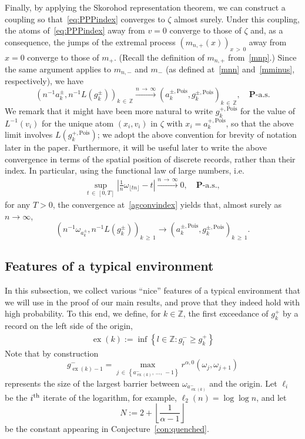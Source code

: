 \documentclass[10pt]{amsart}
\theoremstyle{definition}\newtheorem{defi}[theo]{Definition}\newtheorem{rema}[theo]{Remark}\newtheorem{exam}[theo]{Example}\newtheorem{exem}[theo]{Example}\newtheorem{nota}[theo]{Notation}
\newcommand{\Z}{\mathbb Z}
\newcommand{\bfP}{\mathbf{P}}
\newcommand{\Pois}{\text{Pois}}
\newcommand\ex{\operatorname{ex}}
\newcommand{\aat}[1]{a_{\ex(#1)}^-}
\newcommand{\gtt}[1]{g_{\ex(#1)-1}^-}
\begin{document}
Finally, by applying the Skorohod representation theorem, we can construct a coupling so that~\eqref{eq:PPPindex} converges to $\zeta$ almost surely. Under this coupling, the atoms of~\eqref{eq:PPPindex} away from $v=0$ converge to those of $\zeta$ and, as a consequence, the jumps of the extremal process $(m_{n,+}(x))_{x\,>\,0}$ away from $x=0$ converge to those of $m_+$. (Recall the definition of $m_{n,+}$ from~\eqref{mnp}.) Since the same argument applies to $m_{n,-}$ and $m_-$ (as defined at~\eqref{mnn} and~\eqref{mminus}, respectively), we have
\begin{equation}\label{agconvindex}
\left(n^{-1}{a_k^\pm},n^{-1}L\left(g_k^\pm\right)\right)_{k\,\in\,\Z}\xrightarrow{n\,\to\,\infty} \left(a_k^{\pm,\Pois},g_k^{\pm,\Pois}\right)_{k\,\in\,\Z},\quad\bfP\text{-a.s.}
\end{equation}
We remark that it might have been more natural to write $g_k^{+,\Pois}$ for the value of $L^{-1}(v_i)$ for the unique atom $(x_i,v_i)$ in $\zeta$ with $x_i=a_k^{+,\Pois}$, so that the above limit involves $L(g_k^{+,\Pois})$; we adopt the above convention for brevity of notation later in the paper. Furthermore, it will be useful later to write the above convergence in terms of the spatial position of discrete records, rather than their index. In particular, using the functional law of large numbers, i.e.\
\begin{align*}
\sup_{t\,\in\,[0,T]}\left|\tfrac{1}{n}\omega_{\lfloor tn\rfloor}-t\right|\xrightarrow{n\,\to\,\infty} 0,\quad \bfP\text{-a.s.},
\end{align*}
for any $T>0$, the convergence at~\eqref{agconvindex} yields that, almost surely as $n\to\infty$,
\begin{equation}\label{agconv}
\left(n^{-1}\omega_{a_k^\pm},n^{-1}L\left(g_k^\pm\right)\right)_{k\,\geq\,1}\rightarrow \left(a_k^{\pm,\Pois},g_k^{\pm,\Pois}\right)_{k\,\geq\,1}.
\end{equation}

\subsection{Features of a typical environment}\label{22}

In this subsection, we collect various ``nice'' features of a typical environment that we will use in the proof of our main results, and prove that they indeed hold with high probability. To this end, we define, for $k\in\Z$, the first exceedance of $g_k^+$ by a record on the left side of the origin,
\begin{align}\label{eq:def_ex}
\ex(k):=\inf\left\{l\in\Z:g^-_l\geq g^+_k\right\}
\end{align}
Note that by construction
\[
\gtt{k}=\max_{j\,\in\,\left\{\aat{k},\,\dots,\,-1\right\}}r^{\alpha,0}\left(\omega_j,\omega_{j+1}\right)
\]
represents the size of the largest barrier between $\omega_{\aat{k}}$ and the origin. Let $\ell_i$ be the $i^{\rm th}$ iterate of the logarithm, for example, $\ell_2(n)=\log\log n$, and let
\[
N:=2+\left\lfloor\frac{1}{\alpha-1}\right\rfloor
\]
be the constant appearing in Conjecture~\ref{con:quenched}.
\end{document}
